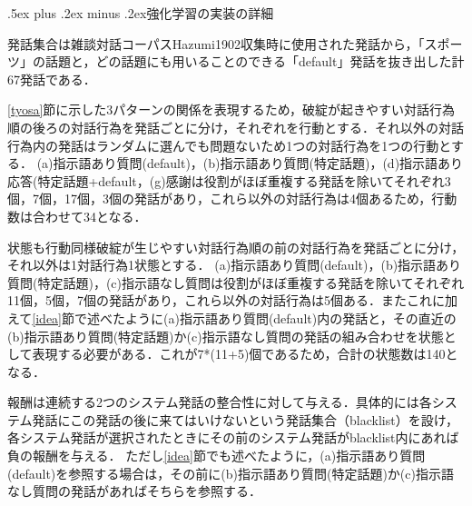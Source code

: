 \documentclass[a4,twocolumn,dvipdfmx]{jarticle}
\makeatletter
\def\section{\@startsection{section}{1}{\z@}{2ex plus .2ex minus .2ex}%
			{.5ex plus .2ex minus .2ex}{\large\bfseries}}
\def\subsection{\@startsection{subsection}{1}{\z@}{.7ex plus .2ex minus .2ex}%
			{.5ex plus .2ex minus .2ex}{\normalsize\bfseries}}
\makeatother
\begin{document}
\section{強化学習の実装の詳細}

発話集合は雑談対話コーパスHazumi1902\cite{Hazumi}収集時に使用された発話から，「スポーツ」の話題と，どの話題にも用いることのできる「default」発話を抜き出した計67発話である．

\ref{tyosa}節に示した3パターンの関係を表現するため，破綻が起きやすい対話行為順の後ろの対話行為を発話ごとに分け，それぞれを行動とする．それ以外の対話行為内の発話はランダムに選んでも問題ないため1つの対話行為を1つの行動とする．
(a)指示語あり質問(default)，(b)指示語あり質問(特定話題)，(d)指示語あり応答(特定話題+default，(g)感謝は役割がほぼ重複する発話を除いてそれぞれ3個，7個，17個，3個の発話があり，これら以外の対話行為は4個あるため，行動数は合わせて34となる．

状態も行動同様破綻が生じやすい対話行為順の前の対話行為を発話ごとに分け，それ以外は1対話行為1状態とする．
(a)指示語あり質問(default)，(b)指示語あり質問(特定話題)，(c)指示語なし質問は役割がほぼ重複する発話を除いてそれぞれ11個，5個，7個の発話があり，これら以外の対話行為は5個ある．またこれに加えて\ref{idea}節で述べたように(a)指示語あり質問(default)内の発話と，その直近の(b)指示語あり質問(特定話題)か(c)指示語なし質問の発話の組み合わせを状態として表現する必要がある．これが7*(11+5)個であるため，合計の状態数は140となる．

報酬は連続する2つのシステム発話の整合性に対して与える．具体的には各システム発話にこの発話の後に来てはいけないという発話集合（blacklist）を設け，
各システム発話が選択されたときにその前のシステム発話がblacklist内にあれば負の報酬を与える．
ただし\ref{idea}節でも述べたように，(a)指示語あり質問(default)を参照する場合は，その前に(b)指示語あり質問(特定話題)か(c)指示語なし質問の発話があればそちらを参照する．
\end{document}
